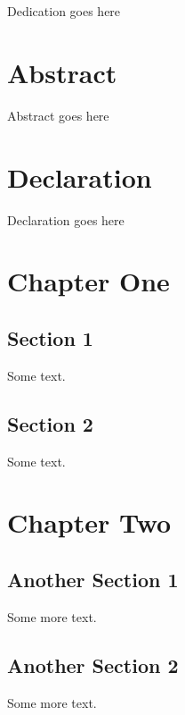 \documentclass[a4paper,twoside,12pt]{book}
\begin{document}
\dominitoc
\chapter*{ } %
\mtcaddchapter           %
Dedication goes here

\chapter*{Abstract}
\mtcaddchapter[Abstract] %
Abstract goes here

\chapter*{Declaration}
\mtcaddchapter[Declaration] %
Declaration goes here
\tableofcontents
\decrementmtc %
\chapter{Chapter One}
\minitoc

\section{Section 1}
Some text.

\section{Section 2}
Some text.

\chapter{Chapter Two}
\minitoc

\section{Another Section 1}
Some more text.

\section{Another Section 2}
Some more text.
\end{document}
